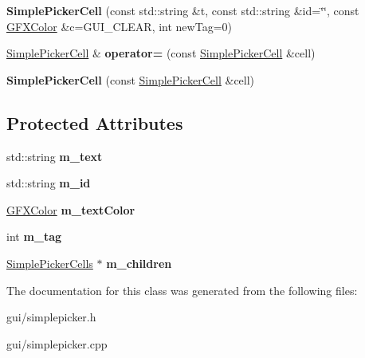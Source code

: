 \begin{DoxyCompactItemize}
\item 
{\bfseries Simple\+Picker\+Cell} (const std\+::string \&t, const std\+::string \&id=\char`\"{}\char`\"{}, const \hyperlink{structGFXColor}{G\+F\+X\+Color} \&c=G\+U\+I\+\_\+\+C\+L\+E\+AR, int new\+Tag=0)\hypertarget{classSimplePickerCell_ac46d338790d0c9e349b51a758f0e32b1}{}\label{classSimplePickerCell_ac46d338790d0c9e349b51a758f0e32b1}

\item 
\hyperlink{classSimplePickerCell}{Simple\+Picker\+Cell} \& {\bfseries operator=} (const \hyperlink{classSimplePickerCell}{Simple\+Picker\+Cell} \&cell)\hypertarget{classSimplePickerCell_a6aac32297f98d6b85e774be27af63fe9}{}\label{classSimplePickerCell_a6aac32297f98d6b85e774be27af63fe9}

\item 
{\bfseries Simple\+Picker\+Cell} (const \hyperlink{classSimplePickerCell}{Simple\+Picker\+Cell} \&cell)\hypertarget{classSimplePickerCell_acbf6a02c14b518f14051d6a68cd5ceb6}{}\label{classSimplePickerCell_acbf6a02c14b518f14051d6a68cd5ceb6}

\end{DoxyCompactItemize}
\subsection*{Protected Attributes}
\begin{DoxyCompactItemize}
\item 
std\+::string {\bfseries m\+\_\+text}\hypertarget{classSimplePickerCell_aedb68d74f1d6600a1b0738d6e2cf9fec}{}\label{classSimplePickerCell_aedb68d74f1d6600a1b0738d6e2cf9fec}

\item 
std\+::string {\bfseries m\+\_\+id}\hypertarget{classSimplePickerCell_aef250af4f10e463cc53da05e778b8e87}{}\label{classSimplePickerCell_aef250af4f10e463cc53da05e778b8e87}

\item 
\hyperlink{structGFXColor}{G\+F\+X\+Color} {\bfseries m\+\_\+text\+Color}\hypertarget{classSimplePickerCell_a4facde5fc53d77d518704fc97dd25f33}{}\label{classSimplePickerCell_a4facde5fc53d77d518704fc97dd25f33}

\item 
int {\bfseries m\+\_\+tag}\hypertarget{classSimplePickerCell_a5c261eae195afb9e2ec8a5c97785fd42}{}\label{classSimplePickerCell_a5c261eae195afb9e2ec8a5c97785fd42}

\item 
\hyperlink{classSimplePickerCells}{Simple\+Picker\+Cells} $\ast$ {\bfseries m\+\_\+children}\hypertarget{classSimplePickerCell_aaec8d8343be6027340506dc8f7dfbde1}{}\label{classSimplePickerCell_aaec8d8343be6027340506dc8f7dfbde1}

\end{DoxyCompactItemize}


The documentation for this class was generated from the following files\+:\begin{DoxyCompactItemize}
\item 
gui/simplepicker.\+h\item 
gui/simplepicker.\+cpp\end{DoxyCompactItemize}
